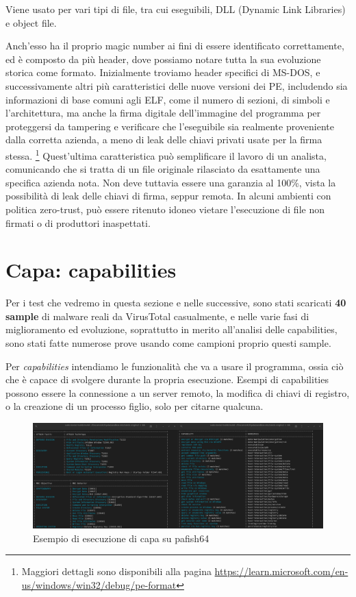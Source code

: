 Viene usato per vari tipi di file, tra cui eseguibili, DLL (Dynamic Link Libraries) e object file.

Anch'esso ha il proprio magic number ai fini di essere identificato correttamente, ed è composto da più header, dove possiamo notare tutta la sua evoluzione storica come formato. Inizialmente troviamo header specifici di MS-DOS, e successivamente altri più caratteristici delle nuove versioni dei PE, includendo sia informazioni di base comuni agli ELF, come il numero di sezioni, di simboli e l'architettura, ma anche la firma digitale dell'immagine del programma per proteggersi da tampering e verificare che l'eseguibile sia realmente proveniente dalla corretta azienda, a meno di leak delle chiavi privati usate per la firma stessa.
\footnote{Maggiori dettagli sono disponibili alla pagina \url{https://learn.microsoft.com/en-us/windows/win32/debug/pe-format}}
Quest'ultima caratteristica può semplificare il lavoro di un analista, comunicando che si tratta di un file originale rilasciato da esattamente una specifica azienda nota. Non deve tuttavia essere una garanzia al 100\%, vista la possibilità di leak delle chiavi di firma, seppur remota.
In alcuni ambienti con politica zero-trust, può essere ritenuto idoneo vietare l'esecuzione di file non firmati o di produttori inaspettati.

\section{Capa: capabilities}
\label{chap:capa}
Per i test che vedremo in questa sezione e nelle successive, sono stati scaricati \textbf{40 sample} di malware reali da VirusTotal casualmente, e nelle varie fasi di miglioramento ed evoluzione, soprattutto in merito all'analisi delle capabilities, sono stati fatte numerose prove usando come campioni proprio questi sample.

Per \emph{capabilities} intendiamo le funzionalità che va a usare il programma, ossia ciò che è capace di svolgere durante la propria esecuzione. Esempi di capabilities possono essere la connessione a un server remoto, la modifica di chiavi di registro, o la creazione di un processo figlio, solo per citarne qualcuna.

\begin{figure}[!htb]
    \centering
    \includegraphics[width=\textwidth]{assets/capa_example_invocation.png}
    \caption{Esempio di esecuzione di capa su pafish64}
    \label{fig:capa_example_invocation}
\end{figure}


